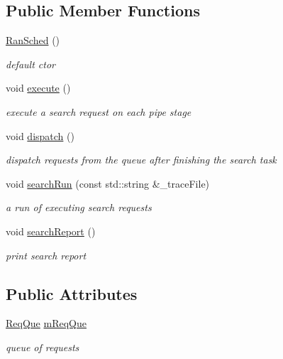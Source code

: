 \subsection*{Public Member Functions}
\begin{DoxyCompactItemize}
\item 
\hyperlink{classRanSched_a632d4ba97ca27e5fb85e18db90846e21}{Ran\-Sched} ()
\begin{DoxyCompactList}\small\item\em default ctor \end{DoxyCompactList}\item 
void \hyperlink{classRanSched_a6d49e5f356711dfc6276dea83893817a}{execute} ()
\begin{DoxyCompactList}\small\item\em execute a search request on each pipe stage \end{DoxyCompactList}\item 
void \hyperlink{classRanSched_ab4b2fd3638b8634f907062f5775a92f2}{dispatch} ()
\begin{DoxyCompactList}\small\item\em dispatch requests from the queue after finishing the search task \end{DoxyCompactList}\item 
void \hyperlink{classRanSched_a7ec1bfa1ebaff80e1b9321afeaa166e9}{search\-Run} (const std\-::string \&\-\_\-trace\-File)
\begin{DoxyCompactList}\small\item\em a run of executing search requests \end{DoxyCompactList}\item 
void \hyperlink{classRanSched_a9ff7a9d9b40b20752dc9f975d128dafd}{search\-Report} ()
\begin{DoxyCompactList}\small\item\em print search report \end{DoxyCompactList}\end{DoxyCompactItemize}
\subsection*{Public Attributes}
\begin{DoxyCompactItemize}
\item 
\hyperlink{structRanSched_1_1ReqQue}{Req\-Que} \hyperlink{classRanSched_af9be4c8624431923a682d85ea61bba5c}{m\-Req\-Que}
\begin{DoxyCompactList}\small\item\em queue of requests \end{DoxyCompactList}\end{DoxyCompactItemize}
